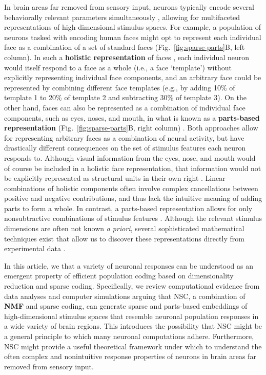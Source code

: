 In brain areas far removed from sensory input,
neurons typically encode several behaviorally relevant parameters
simultaneously \cite{Rigotti2013,Park2014,PaganRust2014,PougetSejnowski1997},
allowing for multifaceted representations of high-dimensional stimulus spaces.
For example, a population of neurons tasked with encoding human faces
might opt to represent each individual face as a combination of a set of
standard faces (Fig.~\ref{fig:sparse-parts}B, left column).
In such a \textbf{holistic representation} of faces \cite{TanakaFarah1993},
each individual neuron would itself respond to a face as a whole
(i.e., a face `template')
without explicitly representing individual face components,
and an arbitrary face could be represented by 
combining different face templates
(e.g., by adding 10\% of template 1 to 20\% of template 2
and subtracting 30\% of template 3).
On the other hand, faces can also be represented as a combination
of individual face components, such as eyes, noses, and mouth,
in what is known as a \textbf{parts-based representation}
(Fig.~\ref{fig:sparse-parts}B, right column) \cite{Palmer1977}.
Both approaches allow for representing arbitrary faces as a combination of
neural activity, but have drastically different consequences on the
set of stimulus features each neuron responds to.
Although visual information from the eyes, nose, and mouth would of course be
included in a holistic face representation,
that information would not be explicitly represented as structural units
in their own right \cite{TanakaFarah1993}.
Linear combinations of holistic components often involve complex cancellations
between positive and negative contributions,
and thus lack the intuitive meaning of adding parts to form a whole.
In contrast, a parts-based representation allows for only nonsubtractive
combinations of stimulus features \cite{Palmer1977}.
Although the relevant stimulus dimensions are often not known \emph{a priori},
several sophisticated mathematical techniques exist that
allow us to discover these representations directly from experimental data
\cite{Brunton2016,CunninghamYu2014,PillowSimoncelli2006,Sharpee2014,Gao2017}.

In this article, we  that a variety of neuronal responses
can be understood as an emergent property of efficient population coding
based on dimensionality reduction and sparse coding.
Specifically, we review computational evidence
from data analyses and computer simulations arguing that \ac{NSC}, 
a combination of \textbf{\ac{NMF}}
\cite{PaateroTapper1994,LeeSeung1999} 
and sparse coding,
can generate sparse and parts-based embeddings of
high-dimensional stimulus spaces
that resemble neuronal population responses in a 
wide variety of brain regions.
This introduces the possibility that \ac{NSC} might
be a general principle to which many neuronal computations adhere.
Furthermore, \ac{NSC} might provide a useful theoretical framework under which
to understand the often complex and nonintuitive response properties of neurons
in brain areas far removed from sensory input.
